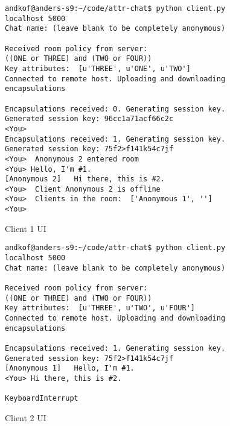 \begin{figure}
\centering
\begin{lstlisting}[breaklines=true, backgroundcolor=\color{mygray} ]
andkof@anders-s9:~/code/attr-chat$ python client.py localhost 5000
Chat name: (leave blank to be completely anonymous) 

Received room policy from server: 
((ONE or THREE) and (TWO or FOUR))
Key attributes:  [u'THREE', u'ONE', u'TWO']
Connected to remote host. Uploading and downloading encapsulations

Encapsulations received: 0. Generating session key.
Generated session key: 96cc1a71acf66c2c
<You> 
Encapsulations received: 1. Generating session key.
Generated session key: 75f2>f141k54c7jf 
<You>  Anonymous 2 entered room
<You> Hello, I'm #1.
[Anonymous 2]   Hi there, this is #2.
<You>  Client Anonymous 2 is offline
<You>  Clients in the room:  ['Anonymous 1', '']
<You> 

\end{lstlisting}
\caption{Client 1 UI}
\label{fig:client1-output}
\end{figure}


\begin{figure}
\centering
\begin{lstlisting}[breaklines=true, backgroundcolor=\color{mygray} ]
andkof@anders-s9:~/code/attr-chat$ python client.py localhost 5000
Chat name: (leave blank to be completely anonymous) 

Received room policy from server: 
((ONE or THREE) and (TWO or FOUR))
Key attributes:  [u'THREE', u'TWO', u'FOUR']
Connected to remote host. Uploading and downloading encapsulations

Encapsulations received: 1. Generating session key.
Generated session key: 75f2>f141k54c7jf
[Anonymous 1]   Hello, I'm #1.
<You> Hi there, this is #2.

KeyboardInterrupt
\end{lstlisting}
\caption{Client 2 UI}
\label{fig:client2-output}
\end{figure}

